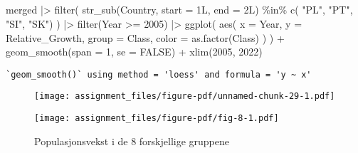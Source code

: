 \documentclass[
  letterpaper,
  DIV=11,
  numbers=noendperiod]{scrartcl}
\newenvironment{Shaded}{\begin{snugshade}}{\end{snugshade}}
\newcommand{\AttributeTok}[1]{\textcolor[rgb]{0.40,0.45,0.13}{#1}}
\newcommand{\ConstantTok}[1]{\textcolor[rgb]{0.56,0.35,0.01}{#1}}
\newcommand{\DecValTok}[1]{\textcolor[rgb]{0.68,0.00,0.00}{#1}}
\newcommand{\FunctionTok}[1]{\textcolor[rgb]{0.28,0.35,0.67}{#1}}
\newcommand{\NormalTok}[1]{\textcolor[rgb]{0.00,0.23,0.31}{#1}}
\newcommand{\SpecialCharTok}[1]{\textcolor[rgb]{0.37,0.37,0.37}{#1}}
\newcommand{\StringTok}[1]{\textcolor[rgb]{0.13,0.47,0.30}{#1}}
\begin{document}
\hypertarget{section}{%
\subsection{}\label{section}}

\begin{Shaded}
\begin{Highlighting}[]
\NormalTok{merged }\SpecialCharTok{|\textgreater{}} 
  \FunctionTok{filter}\NormalTok{(}
    \FunctionTok{str\_sub}\NormalTok{(Country, }\AttributeTok{start =}\NormalTok{ 1L, }\AttributeTok{end =}\NormalTok{ 2L) }\SpecialCharTok{\%in\%} \FunctionTok{c}\NormalTok{( }\StringTok{"PL"}\NormalTok{, }\StringTok{"PT"}\NormalTok{, }\StringTok{"SI"}\NormalTok{, }\StringTok{"SK"}\NormalTok{)}
\NormalTok{  ) }\SpecialCharTok{|\textgreater{}} 
    \FunctionTok{filter}\NormalTok{(Year }\SpecialCharTok{\textgreater{}=} \DecValTok{2005}\NormalTok{) }\SpecialCharTok{|\textgreater{}} 
  \FunctionTok{ggplot}\NormalTok{(}
    \FunctionTok{aes}\NormalTok{(}
      \AttributeTok{x =}\NormalTok{ Year,}
      \AttributeTok{y =}\NormalTok{ Relative\_Growth,}
      \AttributeTok{group =}\NormalTok{ Class,}
      \AttributeTok{color =} \FunctionTok{as.factor}\NormalTok{(Class)}
\NormalTok{    )}
\NormalTok{  ) }\SpecialCharTok{+}
  \FunctionTok{geom\_smooth}\NormalTok{(}\AttributeTok{span =} \DecValTok{1}\NormalTok{, }\AttributeTok{se =} \ConstantTok{FALSE}\NormalTok{) }\SpecialCharTok{+}
  \FunctionTok{xlim}\NormalTok{(}\DecValTok{2005}\NormalTok{, }\DecValTok{2022}\NormalTok{)  }
\end{Highlighting}
\end{Shaded}

\begin{verbatim}
`geom_smooth()` using method = 'loess' and formula = 'y ~ x'
\end{verbatim}

\begin{figure}[H]

{\centering \texttt{[image: assignment\_files/figure-pdf/unnamed-chunk-29-1.pdf]}

}

\end{figure}

\begin{figure}

{\centering \texttt{[image: assignment\_files/figure-pdf/fig-8-1.pdf]}

}

\caption{\label{fig-8}Populasjonsvekst i de 8 forskjellige gruppene}

\end{figure}
\end{document}
